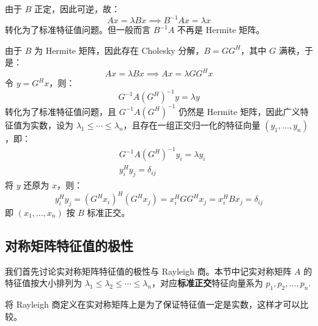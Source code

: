\begin{definition}[广义特征值的等价表述 1]
由于 $B$ 正定，因此可逆，故：
\[
    Ax=\lambda Bx\implies B^{-1}Ax=\lambda x
\]
转化为了标准特征值问题。但一般而言 $B^{-1}A$ 不再是 Hermite 矩阵。
\end{definition}

\begin{definition}[广义特征值的等价表述 2]
由于 $B$ 为 Hermite 矩阵，因此存在 Cholesky 分解，$B=GG^H$，其中 $G$ 满秩，于是：
\[
    Ax=\lambda Bx\implies Ax=\lambda GG^Hx
\]
令 $y=G^Hx$，则：
\[
    G^{-1}A(G^H)^{-1}y=\lambda y
\]
转化为了标准特征值问题，且 $G^{-1}A(G^H)^{-1}$ 仍然是 Hermite 矩阵，因此广义特征值为实数，设为 $\lambda_1\leq\cdots\leq\lambda_n$，且存在一组正交归一化的特征向量 $(y_1,\ldots,y_n)$，即：
\begin{align*}
    &G^{-1}A(G^H)^{-1}y_i=\lambda y_i\\
    &y_i^Hy_j=\delta_{ij}
\end{align*}
将 $y$ 还原为 $x$，则：
\[
    y_i^Hy_j=(G^Hx_i)^H(G^Hx_j)=x_i^HGG^Hx_j=x_i^HBx_j=\delta_{ij}
\]
即 $(x_1,\ldots,x_n)$ 按 $B$ 标准正交。
\end{definition}


\subsection{对称矩阵特征值的极性}

我们首先讨论实对称矩阵特征值的极性与 Rayleigh 商。本节中记实对称矩阵 $A$ 的特征值按大小排列为 $\lambda_1\leq\lambda_2\leq\cdots\leq\lambda_n$，对应\textbf{标准正交}特征向量系为 $p_1,p_2,\ldots,p_n$.

\begin{remark}
将 Rayleigh 商定义在实对称矩阵上是为了保证特征值一定是实数，这样才可以比较。
\end{remark}

